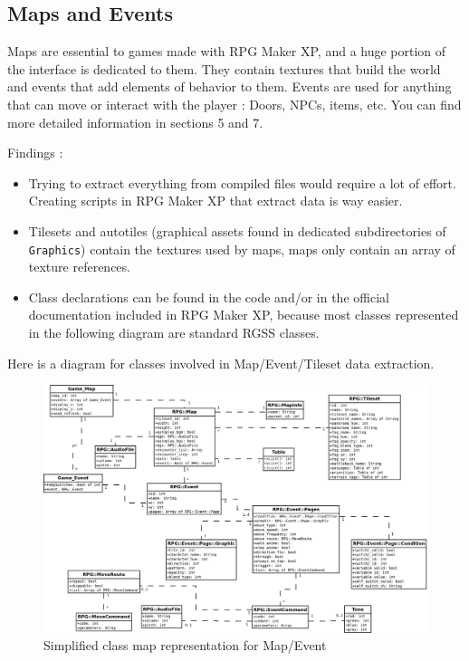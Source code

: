 \documentclass[11pt]{article}
\begin{document}
{\subsection{Maps and Events}

Maps are essential to games made with RPG Maker XP, and a huge portion of the interface is dedicated to them. They contain textures that build the world and events that add elements of behavior to them. Events are used for anything that can move or interact with the player : Doors, NPCs, items, etc. You can find more detailed information in sections 5 and 7.

Findings :
\begin{itemize}
	\item Trying to extract everything from compiled files would require a lot of effort. Creating scripts in RPG Maker XP that extract data is way easier.
	
	\item Tilesets and autotiles (graphical assets found in dedicated subdirectories of \texttt{Graphics}) contain the textures used by maps, maps only contain an array of texture references.
	
	\item Class declarations can be found in the code and/or in the official documentation included in RPG Maker XP, because most classes represented in the following diagram are standard RGSS classes.

\end{itemize}

\newpage
\vspace{4mm}
Here is a diagram for classes involved in Map/Event/Tileset data extraction.
\begin{figure}[!h]
	\centering
	\includegraphics[width=\linewidth]{RMXP_full}
	\caption{Simplified class map representation for Map/Event}
	

\end{figure}}
\end{document}
